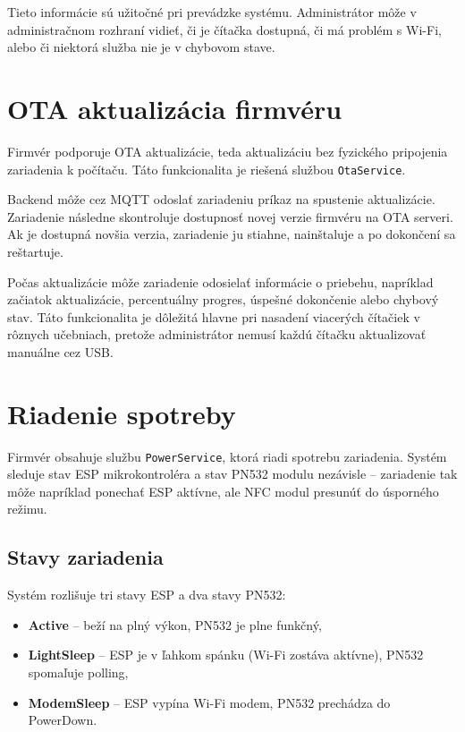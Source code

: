 Tieto informácie sú užitočné pri prevádzke systému. Administrátor môže v administračnom rozhraní vidieť, či je čítačka dostupná, či má problém s Wi-Fi, alebo či niektorá služba nie je v chybovom stave.

\section{OTA aktualizácia firmvéru}
\label{subsec:hardware-ota}

Firmvér podporuje OTA aktualizácie, teda aktualizáciu bez fyzického pripojenia zariadenia k počítaču. Táto funkcionalita je riešená službou \texttt{OtaService}.

Backend môže cez MQTT odoslať zariadeniu príkaz na spustenie aktualizácie. Zariadenie následne skontroluje dostupnosť novej verzie firmvéru na OTA serveri. Ak je dostupná novšia verzia, zariadenie ju stiahne, nainštaluje a po dokončení sa reštartuje.

Počas aktualizácie môže zariadenie odosielať informácie o priebehu, napríklad začiatok aktualizácie, percentuálny progres, úspešné dokončenie alebo chybový stav. Táto funkcionalita je dôležitá hlavne pri nasadení viacerých čítačiek v rôznych učebniach, pretože administrátor nemusí každú čítačku aktualizovať manuálne cez USB.
 
\section{Riadenie spotreby}
\label{subsec:hardware-power-management}

Firmvér obsahuje službu \texttt{PowerService}, ktorá riadi spotrebu zariadenia. Systém sleduje stav ESP mikrokontroléra a stav PN532 modulu nezávisle -- zariadenie tak môže napríklad ponechať ESP aktívne, ale NFC modul presunúť do úsporného režimu.

\subsection*{Stavy zariadenia}

Systém rozlišuje tri stavy ESP a dva stavy PN532:
\begin{itemize}
    \item \textbf{Active} -- beží na plný výkon, PN532 je plne funkčný,
    \item \textbf{LightSleep} -- ESP je v ľahkom spánku (Wi-Fi zostáva aktívne), PN532 spomaľuje polling,
    \item \textbf{ModemSleep} -- ESP vypína Wi-Fi modem, PN532 prechádza do PowerDown.
\end{itemize}

